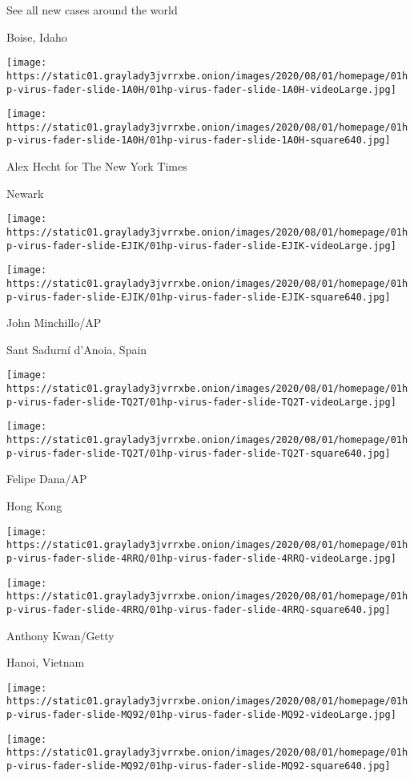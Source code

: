See all new cases around the world

\href{https://www.nytimes3xbfgragh.onion/2020/07/31/world/coronavirus-covid-19.html}{}

Boise, Idaho

\texttt{[image: https://static01.graylady3jvrrxbe.onion/images/2020/08/01/homepage/01hp-virus-fader-slide-1A0H/01hp-virus-fader-slide-1A0H-videoLarge.jpg]}

\texttt{[image: https://static01.graylady3jvrrxbe.onion/images/2020/08/01/homepage/01hp-virus-fader-slide-1A0H/01hp-virus-fader-slide-1A0H-square640.jpg]}

 Alex Hecht for The New York Times

Newark

\texttt{[image: https://static01.graylady3jvrrxbe.onion/images/2020/08/01/homepage/01hp-virus-fader-slide-EJIK/01hp-virus-fader-slide-EJIK-videoLarge.jpg]}

\texttt{[image: https://static01.graylady3jvrrxbe.onion/images/2020/08/01/homepage/01hp-virus-fader-slide-EJIK/01hp-virus-fader-slide-EJIK-square640.jpg]}

 John Minchillo/AP

Sant Sadurní d'Anoia, Spain

\texttt{[image: https://static01.graylady3jvrrxbe.onion/images/2020/08/01/homepage/01hp-virus-fader-slide-TQ2T/01hp-virus-fader-slide-TQ2T-videoLarge.jpg]}

\texttt{[image: https://static01.graylady3jvrrxbe.onion/images/2020/08/01/homepage/01hp-virus-fader-slide-TQ2T/01hp-virus-fader-slide-TQ2T-square640.jpg]}

 Felipe Dana/AP

Hong Kong

\texttt{[image: https://static01.graylady3jvrrxbe.onion/images/2020/08/01/homepage/01hp-virus-fader-slide-4RRQ/01hp-virus-fader-slide-4RRQ-videoLarge.jpg]}

\texttt{[image: https://static01.graylady3jvrrxbe.onion/images/2020/08/01/homepage/01hp-virus-fader-slide-4RRQ/01hp-virus-fader-slide-4RRQ-square640.jpg]}

 Anthony Kwan/Getty

Hanoi, Vietnam

\texttt{[image: https://static01.graylady3jvrrxbe.onion/images/2020/08/01/homepage/01hp-virus-fader-slide-MQ92/01hp-virus-fader-slide-MQ92-videoLarge.jpg]}

\texttt{[image: https://static01.graylady3jvrrxbe.onion/images/2020/08/01/homepage/01hp-virus-fader-slide-MQ92/01hp-virus-fader-slide-MQ92-square640.jpg]}

